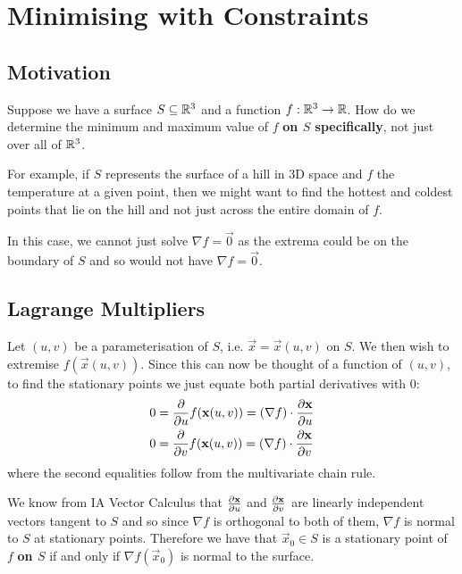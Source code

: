 \documentclass[../main.tex]{subfiles}
\begin{document}
\chapter{Minimising with Constraints}
\section{Motivation}
Suppose we have a surface $S \subseteq \mathbb{R}^3$ and a function $f: \mathbb{R}^3 \to \mathbb{R}$.
How do we determine the minimum and maximum value of $f$ \textbf{on $S$ specifically}, not just over all of $\mathbb{R}^{3}$.

For example, if $S$ represents the surface of a hill in 3D space and $f$ the temperature at a given point, then we might want to find the hottest and coldest points that lie on the hill and not just across the entire domain of $f$.

In this case, we cannot just solve $\nabla f = \vec{0}$ as the extrema could be on the boundary of $S$ and so would not have $\nabla f = \vec{0}$.
\section{Lagrange Multipliers} \label{lagrangeMulti}
Let $(u, v)$ be a parameterisation of $S$, i.e. $\vec{x} = \vec{x}(u, v)$ on $S$.
We then wish to extremise $f(\vec{x}(u, v))$.
Since this can now be thought of a function of $(u, v)$, to find the stationary points we just equate both partial derivatives with 0:
\begin{align*}
  0 &= \pderiv{}{u}f(\vec{x}(u, v)) = (\nabla f) \cdot \pderiv{\vec{x}}{u} \\
  0 &= \pderiv{}{v}f(\vec{x}(u, v)) = (\nabla f) \cdot \pderiv{\vec{x}}{v}
\end{align*}
where the second equalities follow from the multivariate chain rule.

We know from IA Vector Calculus that $\pderiv{\vec{x}}{u}$ and $\pderiv{\vec{x}}{v}$ are linearly independent vectors tangent to $S$ and so since $\nabla f$ is orthogonal to both of them, $\nabla f$ is normal to $S$ at stationary points.
Therefore we have that $\vec{x}_0 \in S$ is a stationary point of $f$ \textbf{on $S$} if and only if $\nabla f(\vec{x}_0)$ is normal to the surface.
\end{document}
